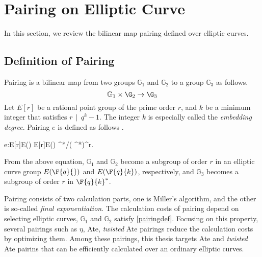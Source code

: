 \section{Pairing on Elliptic Curve}

In this section, we review the bilinear map pairing defined over elliptic curves.

\subsection{Definition of Pairing} \label{secDefPairing} %

Pairing is a bilinear map from two groups $\mathbb{G}_1$ and $\mathbb{G}_2$ to a group $\mathbb{G}_3$ as follows.
\begin{equation}
\mathbb{G}_1 \times \G_2 \rightarrow \G_3 \nonumber
\end{equation}
Let $E[r]$ be a rational point group of the prime order $r$, and $k$ be a minimum integer that satisfies $r\,\mid \,q^k-1$.
The integer $k$ is especially called the {\it embedding degree}.
Pairing $e$ is defined as follows \cite{PAIRING:Hess08}.

\be
e:\;E[r]\cap E(\Fq) \times E[r]\cap E() \rightarrow {} ^*/( ^*)^r. \label{pairingdef}
\ee

From the above equation, $\mathbb{G}_1$ and $\mathbb{G}_2$ become a subgroup of order $r$ in an elliptic curve group $E(\F{q}{})$ and $E(\F{q}{k})$, respectively, and $\mathbb{G}_3$ becomes a subgroup of order $r$ in $\F{q}{k}^*$.

Pairing consists of two calculation parts, one is Miller's algorithm, and the other is so-called {\it final exponentiation}. 
The calculation costs of pairing depend on selecting elliptic curves, $\mathbb{G}_1$ and $\mathbb{G}_2$ satisfy \eqref{pairingdef}.
Focusing on this property, several pairings such as $\eta$, Ate, {\it twisted} Ate pairings reduce the calculation costs by optimizing them.
Among these pairings, this thesis targets Ate and {\it twisted} Ate pairins that can be efficiently calculated over an ordinary elliptic curves.


